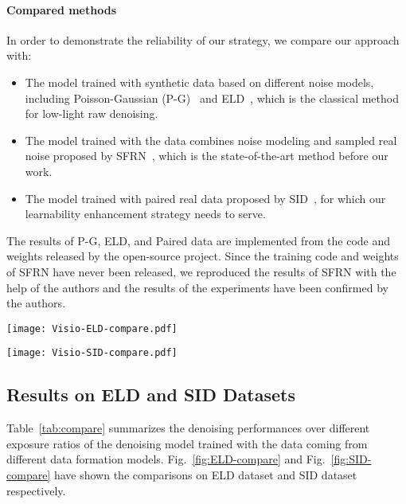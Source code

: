 \documentclass[sigconf,screen,nonacm]{acmart}
\begin{document}
    \paragraph{\textbf{Compared methods}}
    In order to demonstrate the reliability of our strategy, we compare our approach with:
    \begin{itemize}[leftmargin=*]
        \item The model trained with synthetic data based on different noise models, including Poisson-Gaussian (P-G)~\cite{P-G} and ELD~\cite{TPAMI21/ELD}, which is the classical method for low-light raw denoising.

        \item The model trained with the data combines noise modeling and sampled real noise proposed by SFRN~\cite{ICCV21/SFRN}, which is the state-of-the-art method before our work.

        \item The model trained with paired real data proposed by SID~\cite{CVPR18/SID}, for which our learnability enhancement strategy needs to serve.
    \end{itemize}

    The results of P-G, ELD, and Paired data are implemented from the code and weights released by the open-source project. Since the training code and weights of SFRN have never been released, we reproduced the results of SFRN with the help of the authors and the results of the experiments have been confirmed by the authors.


    \begin{figure*}[t!]
        \texttt{[image: Visio-ELD-compare.pdf]}
        \caption{Raw image denoising results on images from the ELD dataset. (Best viewed with zoom)}
        \label{fig:ELD-compare}
    \end{figure*}
    \begin{figure*}[t!]
        \texttt{[image: Visio-SID-compare.pdf]}
        \caption{Raw image denoising results on images from the SID dataset. (Best viewed with zoom)}
        \label{fig:SID-compare}
    \end{figure*}
    


  \subsection{Results on ELD and SID Datasets}
Table~\ref{tab:compare} summarizes the denoising performances over different exposure ratios of the denoising model trained with the data coming from different data formation models. Fig.~\ref{fig:ELD-compare} and Fig.~\ref{fig:SID-compare} have shown the comparisons on ELD dataset and SID dataset respectively.
\end{document}
